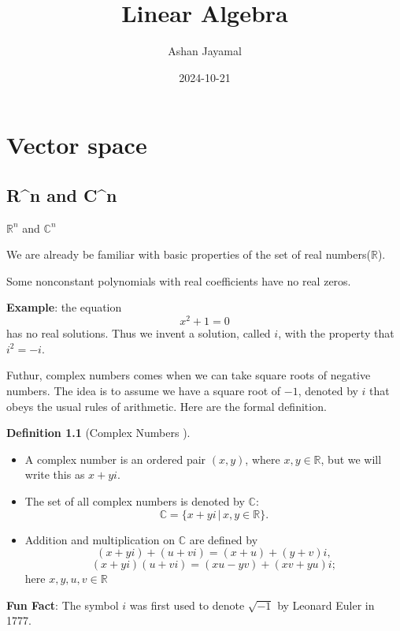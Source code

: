 \documentclass[
]{book}
\title{Linear Algebra}
\author{Ashan Jayamal}
\date{2024-10-21}
\providecommand{\tightlist}{%
  \setlength{\itemsep}{0pt}\setlength{\parskip}{0pt}}
\theoremstyle{definition}
\newtheorem{definition}{Definition}[chapter]
\theoremstyle{definition}
\theoremstyle{definition}
\theoremstyle{definition}
\theoremstyle{remark}
\begin{document}
\maketitle

{
\setcounter{tocdepth}{1}
\tableofcontents
}
\chapter{Vector space}\label{vector-space}

\section{R\^{}n and C\^{}n}\label{rn-and-cn}

\(\mathbb{R}^n\) and \(\mathbb{C}^n\)

We are already be familiar with basic properties of the set of real numbers(\(\mathbb{R}\)).

Some nonconstant polynomials with real coefficients have no real
zeros.

\textbf{Example}: the equation
\[x^2+1=0\]
has no real solutions.
Thus we invent a solution, called \(i\), with the property that \(i^2 = -i\).

Futhur, complex numbers comes when we can take square roots of negative numbers. The idea is to assume we have a square root of \(−1\), denoted by \(i\) that obeys the usual rules of arithmetic. Here are the formal definition.

\begin{definition}[Complex Numbers ]
\protect\hypertarget{def:unnamed-chunk-1}{}\label{def:unnamed-chunk-1}\leavevmode

\begin{itemize}
\tightlist
\item
  A complex number is an ordered pair \((x, y)\), where \(x, y \in \mathbb{R}\), but we will write this as \(x + yi\).
\item
  The set of all complex numbers is denoted by \(\mathbb{C}\):
  \[\mathbb{C} = \{x + yi \,|\, x, y \in \mathbb{R}\}.\]
\item
  Addition and multiplication on \(\mathbb{C}\) are defined by
  \[(x + yi) + (u + vi) = (x + u) + (y + v)i,\]
  \[(x + yi)(u + vi) = (xu - yv) + (xv + yu)i;\]
  here \(x, y, u, v \in \mathbb{R}\)
\end{itemize}

\end{definition}

\textbf{Fun Fact}: The symbol \(i\) was first used to denote \(\sqrt{-1}\) by Leonard Euler in 1777.
\end{document}
